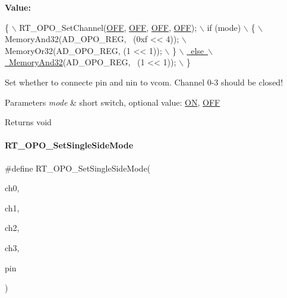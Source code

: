 {\bfseries Value\+:}
\begin{DoxyCode}
\{                                             \(\backslash\)
        RT\_OPO\_SetChannel(\mbox{\hyperlink{a00020_ab43e533f3793920486fb81c580f71564aac132f2982b98bcaa3445e535a03ff75}{OFF}}, \mbox{\hyperlink{a00020_ab43e533f3793920486fb81c580f71564aac132f2982b98bcaa3445e535a03ff75}{OFF}}, \mbox{\hyperlink{a00020_ab43e533f3793920486fb81c580f71564aac132f2982b98bcaa3445e535a03ff75}{OFF}}, \mbox{\hyperlink{a00020_ab43e533f3793920486fb81c580f71564aac132f2982b98bcaa3445e535a03ff75}{OFF}});    \(\backslash\)
        if (mode)                                 \(\backslash\)
        \{                                         \(\backslash\)
            MemoryAnd32(AD\_OPO\_REG, ~(0xf << 4)); \(\backslash\)
            MemoryOr32(AD\_OPO\_REG, (1 << 1));     \(\backslash\)
        \}                                         \mbox{\hyperlink{a00020_ad87cedffcaadc51db22594fce55173d4}{\(\backslash\)}}
\mbox{\hyperlink{a00020_ad87cedffcaadc51db22594fce55173d4}{        else                                      \(\backslash\)}}
\mbox{\hyperlink{a00020_ad87cedffcaadc51db22594fce55173d4}{            MemoryAnd32}}(AD\_OPO\_REG, ~(1 << 1));   \(\backslash\)
    \}
\end{DoxyCode}


Set whether to connecte pin and nin to vcom. Channel 0-\/3 should be closed! 


\begin{DoxyParams}{Parameters}
{\em mode} & short switch, optional value\+: \mbox{\hyperlink{a00020_ab43e533f3793920486fb81c580f71564a977d478dacaae531f95695750d1e9d03}{ON}}, \mbox{\hyperlink{a00020_ab43e533f3793920486fb81c580f71564aac132f2982b98bcaa3445e535a03ff75}{O\+FF}} \\
\hline
\end{DoxyParams}
\begin{DoxyReturn}{Returns}
void 
\end{DoxyReturn}
\mbox{\label{a00002_a6438defc0d6280f2b5baedc039f2e314}} 
\paragraph{\texorpdfstring{R\+T\+\_\+\+O\+P\+O\+\_\+\+Set\+Single\+Side\+Mode}{RT\_OPO\_SetSingleSideMode}}
{\footnotesize\ttfamily \#define R\+T\+\_\+\+O\+P\+O\+\_\+\+Set\+Single\+Side\+Mode(\begin{DoxyParamCaption}\item[{}]{ch0,  }\item[{}]{ch1,  }\item[{}]{ch2,  }\item[{}]{ch3,  }\item[{}]{pin }\end{DoxyParamCaption})}

